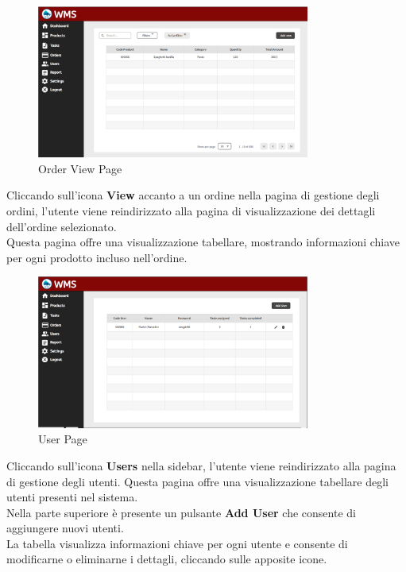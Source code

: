\begin{figure}[H]
    \centering
    \includegraphics[width=0.8\textwidth]{document/sections/img/OrderView.png}
    \caption{Order View Page}
    \label{fig:orderViewPage}
\end{figure}
Cliccando sull'icona \textbf{View} accanto a un ordine nella pagina di gestione degli ordini,
l'utente viene reindirizzato alla pagina di visualizzazione dei dettagli dell'ordine selezionato.\\
Questa pagina offre una visualizzazione tabellare, mostrando informazioni chiave per ogni prodotto
incluso nell'ordine.

\begin{figure}[H]
    \centering
    \includegraphics[width=0.8\textwidth]{document/sections/img/UserPage.png}
    \caption{User Page}
    \label{fig:userPage}
\end{figure}
Cliccando sull'icona \textbf{Users} nella sidebar, l'utente viene reindirizzato alla pagina di gestione degli
utenti. Questa pagina offre una visualizzazione tabellare degli utenti presenti nel sistema.\\
Nella parte superiore è presente un pulsante \textbf{Add User} che consente di aggiungere nuovi utenti.\\
La tabella visualizza informazioni chiave per ogni utente e consente di modificarne o eliminarne i dettagli,
cliccando sulle apposite icone.

